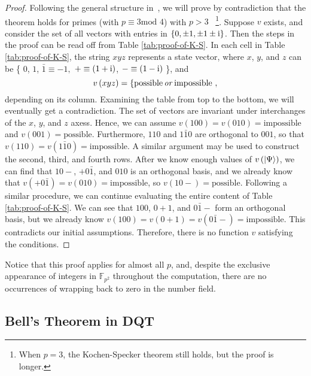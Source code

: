 \documentclass[english,12pt]{iopart}
\newcommand{\ff}[1]{\mathbb{F}_{#1}}
\newcommand{\mod}{\mbox{mod }}
\begin{document}
\begin{proof}

  Following the general structure in~\cite{peres1995quantum}, we will
  prove by contradiction that the theorem holds for primes (with
  $p \equiv 3 \mod 4$) with $p > 3$ ~\footnote{\label{fn:p>3}When
    $p=3$, the Kochen-Specker theorem still holds, but the proof is
    longer.}. Suppose $v$ exists, and consider the set of all vectors
  with entries in $\left\{ 0,\pm1,\pm1\pm\mathrm{i}\right\} $. Then the
  steps in the proof can be read off from Table
  \ref{tab:proof-of-K-S}.  In each cell in Table
  \ref{tab:proof-of-K-S}, the string $xyz$ represents a state vector,
  where $x$, $y$, and $z$ can be \{ $0$, $1$, $\bar{1}\equiv -1,$
  ${+} \equiv (1+\mathrm{i})$, ${-} \equiv (1-\mathrm{i})$ \}, and
\[
v\left( xyz \right)= \{\textrm{possible}\, \mbox{\it or\/}\,
\textrm{impossible} \ , \]
depending on its column.  Examining the table from top to the bottom,
we will eventually get a contradiction.  The set of vectors are
invariant under interchanges of the $x$, $y$, and $z$ axess.  Hence,
we can assume
$v\left(100\right)=v\left(010\right)=\textrm{impossible}$ and
$v\left(001\right)=\textrm{possible}$.  Furthermore, $110$ and
$1\bar{1}0$ are orthogonal to $001$, so that
$v\left(110\right)=v\left(1\bar{1}0\right)=\textrm{impossible}$.  A
similar argument may be used to construct the second, third, and
fourth rows.  After we know enough values of
$v\left({\left\vert{\Psi}\right\rangle}\right)$, we can find that $10{-}$, ${+}0\bar{1}$,
and $010$ is an orthogonal basis, and we already know that
$v\left({+}0\bar{1}\right)=v\left(010\right)=\textrm{impossible}$, so
$v\left(10{-}\right)=\textrm{possible}$.  Following a similar
procedure, we can continue evaluating the entire content of Table
\ref{tab:proof-of-K-S}.  We can see that $100$, $0{+}1$, and
$0\bar{1}{-}$ form an orthogonal basis, but we already know
$v\left(100\right)=v\left(0{+}1\right)=v\left(0\bar{1}{-}\right)
=\textrm{impossible}$.
This contradicts our initial assumptions. Therefore, there is no
function $v$ satisfying the conditions.
\end{proof}
Notice that this proof applies for almost all $p$, and, despite
the exclusive appearance of integers in $\ff{p^{2}}$ throughout the
computation, there are no occurrences of wrapping back to zero in the
number field.

\subsection {Bell's Theorem in DQT}
\end{document}
